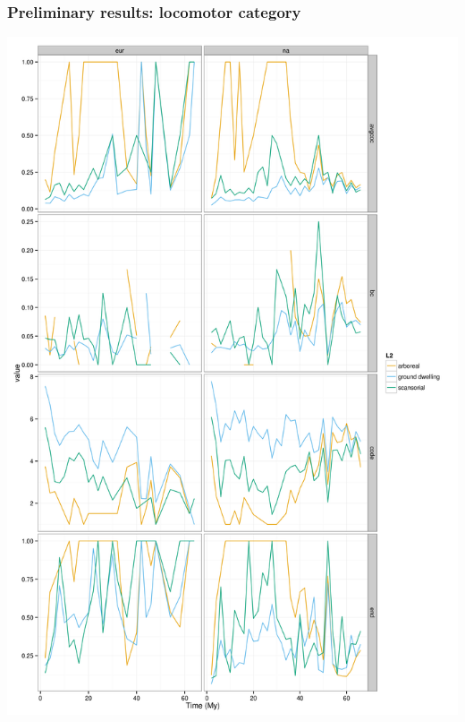 \documentclass{beamer} \usepackage{amsmath,amsthm}
\begin{document}
\begin{frame}
  \frametitle{Preliminary results: locomotor category}

  \begin{center}
    \includegraphics[height = 0.8\textheight, width = \textwidth, keepaspectratio = true]{figure/locos}
  \end{center}
\end{frame}
\end{document}
